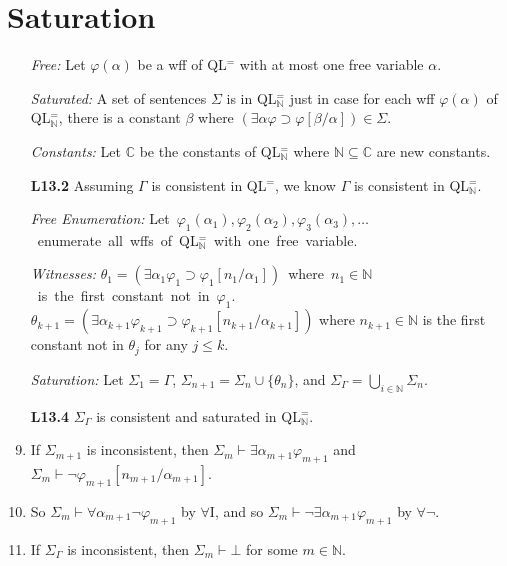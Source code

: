 \documentclass[a4paper, 11pt]{article} %
\def\proves{\ensuremath{\vdash}}
\newcommand{\set}[1]{\lbrace#1\rbrace} %
\newcommand{\N}{\mathbb{N}}
\newcommand{\C}{\mathbb{C}}
\newcommand{\qt}[2]{#1 #2} %
\newcommand{\unisub}[2]{[#1/#2]}
\def\metaA{\ensuremath{\varphi}}
\begin{document}
\section*{Saturation}

\begin{enumerate}
  \item[\it Free:] Let $\metaA(\alpha)$ be a wff of QL$^=$ with at most one free variable $\alpha$.
  \item[\it Saturated:] A set of sentences $\Sigma$ is  in QL$^=_{\N}$ just in case for each wff $\metaA(\alpha)$ of QL$^=_{\N}$, there is a constant $\beta$ where $(\qt{\exists}{\alpha}\metaA \supset \metaA\unisub{\beta}{\alpha})\in\Sigma$.
  \item[\it Constants:] Let $\C$ be the constants of QL$^=_{\N}$ where $\N\subseteq\C$ are new constants.
  \item[\bf L13.2] Assuming $\Gamma$ is consistent in QL$^=$, we know $\Gamma$ is consistent in QL$^=_{\N}$.
  \item[\it Free Enumeration:] \mbox{Let $\metaA_1(\alpha_1),\metaA_2(\alpha_2),\metaA_3(\alpha_3),\ldots$ enumerate all wffs of QL$^=_{\N}$ with one free variable.}
  \item[\it Witnesses:] \mbox{$\theta_1=(\qt{\exists}{\alpha_1}\metaA_1\supset \metaA_1\unisub{n_1}{\alpha_1})$ where $n_1\in\N$ is the first constant not in $\metaA_1$.}\vspace{.05in}\\
    $\theta_{k+1}=(\qt{\exists}{\alpha_{k+1}}\metaA_{k+1}\supset \metaA_{k+1}\unisub{n_{k+1}}{\alpha_{k+1}})$  where $n_{k+1}\in\N$ is the first constant not in $\theta_j$ for any $j\leq k$.
  \item[\it Saturation:] Let $\Sigma_1 = \Gamma$, $\Sigma_{n+1} = \Sigma_n\cup\set{\theta_n}$, and $\Sigma_\Gamma = \bigcup_{i\in\N}\Sigma_n$.
  \item[\bf L13.4] $\Sigma_\Gamma$ is consistent and saturated in QL$^=_{\N}$.
  \item If $\Sigma_{m+1}$ is inconsistent, then $\Sigma_m\proves \qt{\exists}{\alpha_{m+1}}\metaA_{m+1}$ and $\Sigma_m\proves\neg\metaA_{m+1}\unisub{n_{m+1}}{\alpha_{m+1}}$.
  \item So $\Sigma_m\proves \qt{\forall}{\alpha_{m+1}}\neg\metaA_{m+1}$ by $\forall$I, and so $\Sigma_m\proves \neg\qt{\exists}{\alpha_{m+1}}\metaA_{m+1}$ by $\forall\neg$.
  \item If $\Sigma_\Gamma$ is inconsistent, then $\Sigma_m\proves\bot$ for some $m\in\N$.
\end{enumerate}
\end{document}
